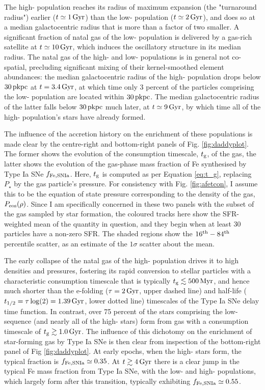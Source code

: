 The high-\afe{} population reaches its radius of maximum expansion (the "turnaround radius") earlier ($t\simeq 1\,{\rm Gyr}$) than the low-\afe{} population ($t\simeq 2\,{\rm Gyr}$), and does so at a median galactocentric radius that is more than a factor of two smaller. A significant fraction of natal gas of the low-\afe{} population is delivered by a gas-rich satellite at $t\simeq 10\,{\rm Gyr}$, which induces the oscillatory structure in its median radius. The natal gas of the high- and low-\afe{} populations is in general not co-spatial, precluding significant mixing of their kernel-smoothed element abundances: the median galactocentric radius of the high-\afe{} population drops below $30\,{\rm pkpc}$ at $t=3.4\,{\rm Gyr}$, at which time only 3 percent of the particles comprising the low-\afe{} population are located within $30\,{\rm pkpc}$. The median galactocentric radius of the latter falls below $30\,{\rm pkpc}$ much later, at $t\simeq 9\,{\rm Gyr}$, by which time all of the high-\afe{} population's stars have already formed. 

The influence of the accretion history on the enrichment of these populations is made clear by the centre-right and bottom-right panels of Fig. \ref{fig:daddyplot}. The former shows the evolution of the consumption timescale, $t_{\rm g}$, of the gas, the latter shows the evolution of the gas-phase mass fraction of Fe synthesised by Type Ia SNe $f_{\rm Fe,SNIa}$. Here, $t_{\rm g}$ is computed as per Equation \ref{eq:t_g}, replacing $P_\star$ by the gas particle's pressure. For consistency with Fig. \ref{fig:afetcon}, I assume this to be the equation of state pressure corresponding to the density of the gas, $P_{\rm eos}(\rho)$. Since I am specifically concerned in these two panels with the subset of the gas sampled by star formation, the coloured tracks here show the SFR-weighted mean of the quantity in question, and they begin when at least 30 particles have a non-zero SFR. The shaded regions show the $16^{\rm th}-84^{\rm th}$ percentile scatter, as an estimate of the $1\sigma$ scatter about the mean. 

The early collapse of the natal gas of the high-\afe{} population drives it to high densities and pressures, fostering its rapid conversion to stellar particles with a characteristic consumption timescale that is typically $t_{\rm g} \lesssim 500\,{\rm Myr}$, and hence much shorter than the e-folding ($\tau=2\,{\rm Gyr}$, upper dashed line) and half-life ($t_{1/2}=\tau\log(2)=1.39\,{\rm Gyr}$, lower dotted line) timescales of the Type Ia SNe delay time function. In contrast, over 75 percent of the stars comprising the low-\afe{} sequence (and nearly all of the high-\feh{} stars) form from gas with a consumption timescale of $t_{\rm g} \gtrsim 1.0\,{\rm Gyr}$. The influence of this dichotomy on the enrichment of star-forming gas by Type Ia SNe is then clear from inspection of the bottom-right panel of Fig \ref{fig:daddyplot}. At early epochs, when the high-\afe{} stars form, the typical fraction is $f_{\rm Fe,SNIa} \simeq 0.35$. At $t \gtrsim 4\,{\rm Gyr}$ there is a clear jump in the typical Fe mass fraction from Type Ia SNe, with the low-\afe{} and high-\feh{} populations, which largely form after this transition, typically exhibiting $f_{\rm Fe,SNIa} \simeq 0.55$.


